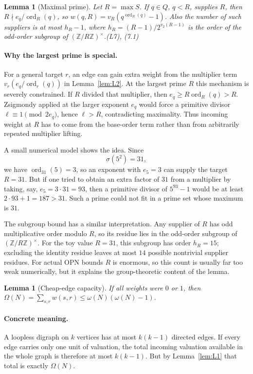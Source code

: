 \documentclass[11pt]{article}
\newtheorem{lemma}[theorem]{Lemma}
\theoremstyle{definition}
\theoremstyle{remark}
\DeclareMathOperator{\ord}{ord}
\newcommand{\Z}{\mathbb{Z}}
\begin{document}
\begin{lemma}[Maximal prime]\label{lem:L7}
Let $R=\max S$. If $q\in Q$, $q<R$, supplies $R$, then
$R\nmid e_q/\ord_R(q)$, so $w(q,R)=v_R(q^{\ord_R(q)}-1)$. Also the
number of such suppliers is at most $h_R-1$, where
$h_R=(R-1)/2^{v_2(R-1)}$ is the order of the odd-order subgroup of
$(\Z/R\Z)^\times$.\hfill(L7), (7.1)
\end{lemma}

\paragraph{Why the largest prime is special.}
For a general target $r$, an edge can gain extra weight from the multiplier
term $v_r(e_q/\ord_r(q))$ in Lemma~\ref{lem:L2}.  At the largest prime $R$
this mechanism is severely constrained.  If $R$ divided that multiplier,
then $e_q\ge R\ord_R(q)>R$.  Zsigmondy applied at the larger exponent $e_q$
would force a primitive divisor $\ell\equiv1\pmod{2e_q}$, hence
$\ell>R$, contradicting maximality.  Thus incoming weight at $R$ has to come
from the base-order term rather than from arbitrarily repeated multiplier
lifting.

A small numerical model shows the idea.  Since
\[
\sigma(5^2)=31,
\]
we have $\ord_{31}(5)=3$, so an exponent with $e_5=3$ can supply the target
$R=31$.  But if one tried to obtain an extra factor of $31$ from a multiplier
by taking, say, $e_5=3\cdot31=93$, then a primitive divisor of $5^{93}-1$
would be at least $2\cdot93+1=187>31$.  Such a prime could not fit in a
prime set whose maximum is $31$.

The subgroup bound has a similar interpretation.  Any supplier of $R$ has
odd multiplicative order modulo $R$, so its residue lies in the odd-order
subgroup of $(\Z/R\Z)^\times$.  For the toy value $R=31$, this subgroup has
order $h_R=15$; excluding the identity residue leaves at most $14$ possible
nontrivial supplier residues.  For actual OPN bounds $R$ is enormous, so this
count is usually far too weak numerically, but it explains the group-theoretic
content of the lemma.

\begin{lemma}[Cheap-edge capacity]\label{lem:L8}
If all weights were $0$ or $1$, then
$\Omega(N)=\sum_{s,r}w(s,r)\le\omega(N)(\omega(N)-1)$.
\end{lemma}

\paragraph{Concrete meaning.}
A loopless digraph on $k$ vertices has at most $k(k-1)$ directed edges.  If
every edge carries only one unit of valuation, the total incoming valuation
available in the whole graph is therefore at most $k(k-1)$.  But by
Lemma~\ref{lem:L1} that total is exactly $\Omega(N)$.
\end{document}
